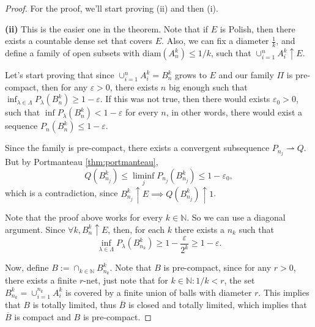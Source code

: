\begin{proof}
  For the proof, we'll start proving (ii) and then (i).

	\vspace{3mm}

	\noindent
	\textbf{(ii)} This is the easier one in the theorem. Note that if $E$ is Polish,
	then there exists a countable dense set that covers $E$. Also, we can fix
	a diameter $\frac{1}{k}$, and define a family of open subsets with $\text{diam}(A_n^k)\leq 1/k$, such that
	$\cup_{i=1}^n A_i^k \uparrow E$.

	Let's start proving that since $\cup_{i=1}^n A_i^k = B^k_n$ grows to $E$
	and our family $\Pi$ is pre-compact, then for any $\varepsilon >0$, there exists $n$ big enough
	such that	$\inf_{\lambda \in \Lambda} P_\lambda(B^k_n) \geq 1 - \varepsilon$.
	If this was not true, then there would exists $\varepsilon_0 > 0$, such that
	$\inf P_\lambda(B^k_n) < 1- \varepsilon$ for every $n$, in other words,
	there would exist a sequence $P_{n}(B^k_n)\leq 1 - \varepsilon$.

	Since the family is pre-compact, there exists a convergent subsequence
	$P_{n_j} \rightharpoonup Q$.
	But by Portmanteau \ref{thm:portmanteau},
	\begin{displaymath}
		Q(B^k_{n_j})\leq \liminf_j P_{n_j}(B^k_{n_j}) \leq 1 - \varepsilon_0,
	\end{displaymath}
	which is a contradiction, since $B^k_{n_j} \uparrow E \implies Q(B^k_{n_j}) \uparrow 1$.

	Note that the proof above works for every $k \in \mathbb N$. So we can use a
	diagonal argument. Since $\forall k, B^k_n \uparrow E$, then, for each $k$
	there exists a $n_k$ such that
	\begin{displaymath}
		\inf_{\lambda \in \Lambda}P_\lambda (B^k_{n_k}) \geq 1 - \frac{\varepsilon}{2^k} \geq 1 -\varepsilon.
	\end{displaymath}

	Now, define $B := \cap_{k \in \mathbb N} B^k_{n_k}$. Note that $B$ is pre-compact,
	since for any $r >0$, there exists a finite $r$-net, just note that for $k \in \mathbb N: 1/k < r$,
	the set $B^k_{n_k} = \cup^{n_k}_{i=1}A^k_i$ is covered by a finite union of balls with diameter $r$.
	This implies that $B$ is totally limited, thus $\overline B$ is closed and totally limited,
	which implies that $\overline B$ is compact and $B$ is pre-compact.


\end{proof}
